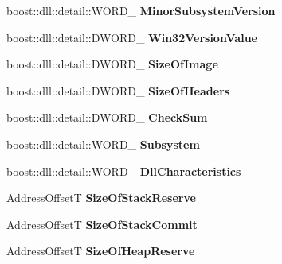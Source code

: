 \begin{DoxyCompactItemize}
\item 
boost\+::dll\+::detail\+::\+W\+O\+R\+D\+\_\+ {\bfseries Minor\+Subsystem\+Version}\hypertarget{a00149_a56a7cb9654b540992637db37d557220e}{}\label{a00149_a56a7cb9654b540992637db37d557220e}

\item 
boost\+::dll\+::detail\+::\+D\+W\+O\+R\+D\+\_\+ {\bfseries Win32\+Version\+Value}\hypertarget{a00149_aff33191e6a81cb86fcc6e4b74c35bc02}{}\label{a00149_aff33191e6a81cb86fcc6e4b74c35bc02}

\item 
boost\+::dll\+::detail\+::\+D\+W\+O\+R\+D\+\_\+ {\bfseries Size\+Of\+Image}\hypertarget{a00149_a2364a207793f55634d51b18b7d4f902e}{}\label{a00149_a2364a207793f55634d51b18b7d4f902e}

\item 
boost\+::dll\+::detail\+::\+D\+W\+O\+R\+D\+\_\+ {\bfseries Size\+Of\+Headers}\hypertarget{a00149_a77dcf3b10986bd7e1b033d872244cfec}{}\label{a00149_a77dcf3b10986bd7e1b033d872244cfec}

\item 
boost\+::dll\+::detail\+::\+D\+W\+O\+R\+D\+\_\+ {\bfseries Check\+Sum}\hypertarget{a00149_a290ac7f032b9881ffffd7bfa46217466}{}\label{a00149_a290ac7f032b9881ffffd7bfa46217466}

\item 
boost\+::dll\+::detail\+::\+W\+O\+R\+D\+\_\+ {\bfseries Subsystem}\hypertarget{a00149_a64a35e14d2ee9b281a3ea11608651764}{}\label{a00149_a64a35e14d2ee9b281a3ea11608651764}

\item 
boost\+::dll\+::detail\+::\+W\+O\+R\+D\+\_\+ {\bfseries Dll\+Characteristics}\hypertarget{a00149_ae44cfe64d4300c53e8d5e34851c935fd}{}\label{a00149_ae44cfe64d4300c53e8d5e34851c935fd}

\item 
Address\+OffsetT {\bfseries Size\+Of\+Stack\+Reserve}\hypertarget{a00149_a2eae163c87c83ceda7a1b3421440170c}{}\label{a00149_a2eae163c87c83ceda7a1b3421440170c}

\item 
Address\+OffsetT {\bfseries Size\+Of\+Stack\+Commit}\hypertarget{a00149_a61ac48e1d510e8e16e5de73712cd507a}{}\label{a00149_a61ac48e1d510e8e16e5de73712cd507a}

\item 
Address\+OffsetT {\bfseries Size\+Of\+Heap\+Reserve}\hypertarget{a00149_ace811d417f6d2a48b5f4b036d42474d9}{}\label{a00149_ace811d417f6d2a48b5f4b036d42474d9}


\end{DoxyCompactItemize}
